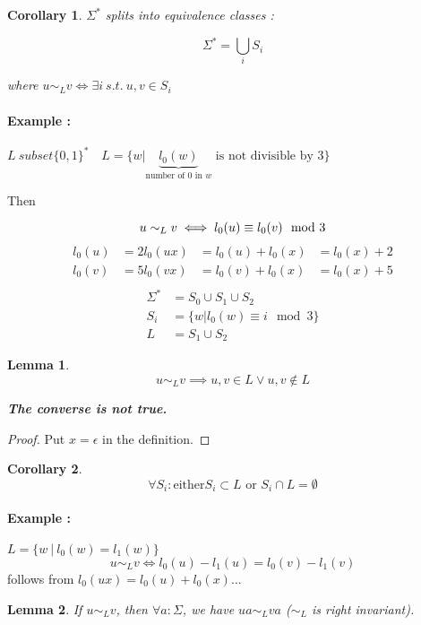 \documentclass[a4paper,11pt]{article}
\newtheorem{lemma}{Lemma}[section]
\newtheorem{cor}{Corollary}[section]
\begin{document}
\begin{cor}
  $\Sigma^*$ splits into equivalence classes :
  
  \[
    \Sigma^* = \bigcup_i S_i
  \]

  where $u \sim_L v \iff \exists i \ s.t.\ u,v \in S_i$
\end{cor}

\paragraph{Example : } $L \ subset \{0,1\}^* \quad L = \{w |
\underbrace{l_0(w)}_{\text{number of $0$ in $w$}} \text{ is not divisible by }
3\}$

Then

\[
  u \sim_L v \iff l_0(u) \equiv l_0(v) \mod 3 \\
\]
\begin{align*}
  l_0(u) &= 2 l_0(ux) &= l_0(u) + l_0(x) &= l_0(x) + 2 \\
  l_0(v) &= 5 l_0(vx) &= l_0(v) + l_0(x) &= l_0(x) + 5 \\
\end{align*}
\begin{align*}
  \Sigma^* &= S_0 \cup S_1 \cup S_2 \\
  S_i &= \{w | l_0(w) \equiv i \mod 3\} \\
  L &= S_1 \cup S_2
\end{align*}

\begin{lemma}
  \[
    u \sim_L v \implies u,v \in L \vee u,v \not \in L
  \]

  \textbf{The converse is not true.}
\end{lemma}

\begin{proof}
  Put $x = \epsilon$ in the definition.
\end{proof}

\begin{cor}
  \[
    \forall S_i : \text{either} S_i \subset L \text{ or } S_i \cap L = \emptyset
  \]
\end{cor}

\paragraph{Example : } $L = \{w\ |\ l_0(w) = l_1(w)\}$
\[
  u \sim_L v \iff l_0(u) - l_1(u) = l_0(v) - l_1(v)
\]
follows from $l_0(ux) = l_0(u) + l_0(x) \dots$

\begin{lemma}
  If $u \sim_L v$, then $\forall a : \Sigma$, we have $ua \sim_L va$ ($\sim_L$
  is right invariant).
\end{lemma}
\end{document}

